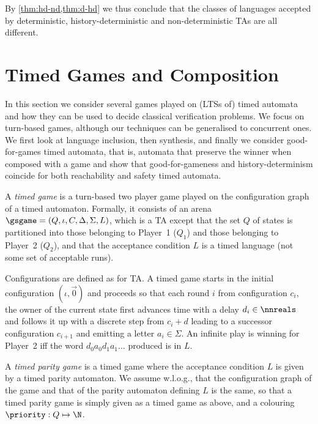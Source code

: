 By \cref{thm:hd-nd,thm:d-hd} we thus conclude that the classes of languages accepted by deterministic, history-deterministic and non-deterministic TAs are all different.

	
	\section{Timed Games and Composition}
	\label{sec_games}
	\label{sec:games}
In this section we consider several games played on (LTSs of) timed automata and how they can be used to decide classical verification problems.
We focus on turn-based games, although our techniques can be generalised to concurrent ones. We first look at language inclusion, then synthesis, and finally we consider good-for-games timed automata, that is, automata that preserve the winner when composed with a game and show that good-for-gameness and history-determinism coincide for both reachability and safety timed automata.



\begin{definition} A \emph{timed game} is a turn-based two player
    game played on the configuration graph of a timed automaton.
    Formally, it consists of an arena $\gsgame=(Q,\iota,  C, \Delta,\Sigma,L)$,
    which is a TA except that the set $Q$ of states is partitioned into those belonging to Player~1 ($Q_1$)
    and those belonging to Player~2 ($Q_2$), and that the acceptance condition $L$ is a timed language
    (not some set of acceptable runs).
    
    Configurations are defined as for TA. %
    A timed game starts in the initial configuration $(\iota,\vec{0})$ and proceeds so that each round $i$ from configuration $c_i$, 
the owner of the current state first advances time with a delay $d_i\in \nnreals$
and follows it up with a discrete step from $c_i+d$ leading to a successor configuration $c_{i+1}$ and emitting a letter $a_i\in\Sigma$.
An infinite play is winning for Player~2 iff the word $d_0a_0d_1a_1\dots$ produced is in $L$. %

A \emph{timed parity game} is a timed game where the acceptance condition $L$ is given by a timed parity automaton. We assume w.l.o.g., that the configuration graph of the game and that of the parity automaton defining $L$ is the same, so that a timed parity game is simply given as a timed game as above, and a colouring $\priority:Q\mapsto\N$.
\end{definition}

